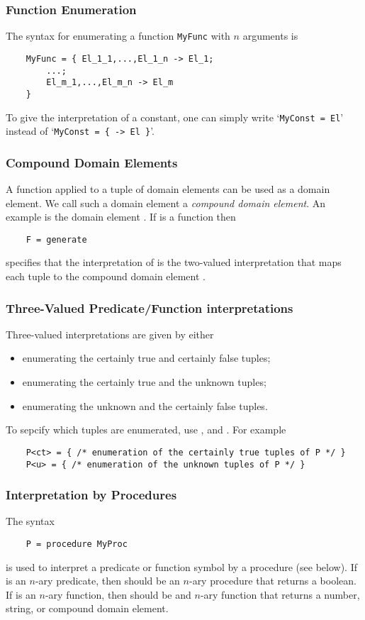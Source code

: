 \documentclass[a4]{article}
\begin{document}
\subsubsection{Function Enumeration}
The syntax for enumerating a function {\tt MyFunc} with $n$ arguments is 
\begin{lstlisting}
	MyFunc = { El_1_1,...,El_1_n -> El_1;
		...;
		El_m_1,...,El_m_n -> El_m
	}
\end{lstlisting}
To give the interpretation of a constant, one can simply write `{\tt MyConst = El}' instead of `{\tt MyConst = \{ -> El \}}'.

\subsubsection{Compound Domain Elements}
A function applied to a tuple of domain elements can be used as a domain element.  We call such a domain element a \textit{compound domain element}.  An example is the domain element . If  is a function then 
\begin{lstlisting}
	F = generate
\end{lstlisting}
specifies that the interpretation of  is the two-valued interpretation that maps each tuple  to the compound domain element .

\subsubsection{Three-Valued Predicate/Function interpretations}
Three-valued interpretations are given by either
\begin{itemize}
	\item enumerating the certainly true and certainly false tuples;
	\item enumerating the certainly true and the unknown tuples;
	\item enumerating the unknown and the certainly false tuples.
\end{itemize}
To sepcify which tuples are enumerated, use ,  and .  For example
\begin{lstlisting}
	P<ct> = { /* enumeration of the certainly true tuples of P */ }
	P<u> = { /* enumeration of the unknown tuples of P */ }
\end{lstlisting}

\subsubsection{Interpretation by Procedures}
The syntax 
\begin{lstlisting}
	P = procedure MyProc
\end{lstlisting}
is used to interpret a predicate or function symbol  by a procedure  (see below).  If  is an $n$-ary predicate, then  should be an $n$-ary procedure that returns a boolean.  If  is an $n$-ary function, then  should be and $n$-ary function that returns a number, string, or compound domain element.
\end{document}
